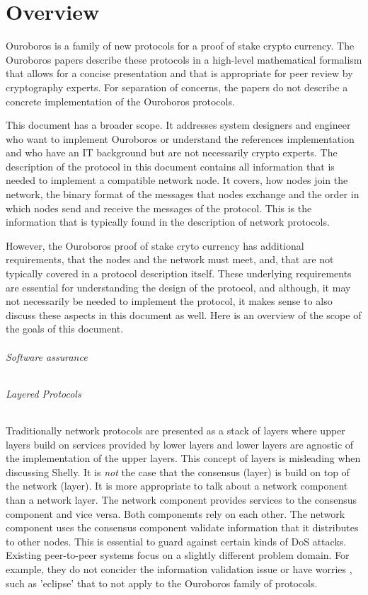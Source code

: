 \documentclass{report}
\newcommand{\wip}[1]{\color{magenta}{#1}\color{black}}
\theoremstyle{definition}{
  \newtheorem{lemma}{Lemma}[section] %
  \newtheorem{definition}[lemma]{Definition}
}
\theoremstyle{theorem}{
  \newtheorem{invariant}[lemma]{Invariant}
  \newtheorem{proofobligation}[lemma]{Proof Obligation}
}
\numberwithin{equation}{lemma}
\begin{document}
\chapter{Overview}
Ouroboros is a family of new protocols for a proof of stake crypto currency.
The Ouroboros papers describe these protocols in a high-level mathematical formalism
that allows for a concise presentation and that is appropriate for peer review by cryptography experts.
For separation of concerns, the papers do not describe a concrete implementation of the Ouroboros
protocols.

This document has a broader scope.
It addresses system designers and engineer who want to implement Ouroboros or understand
the references implementation and who have an IT background but are not necessarily crypto experts. 
The description of the protocol in this document contains
all information that is needed to implement a compatible network node.
It covers, how nodes join the network, the binary format of the messages that nodes exchange and
the order in which nodes send and receive the messages of the protocol.
This is the information that is typically found in the description of network protocols.

However, the Ouroboros proof of stake cryto currency has additional requirements,
that the nodes and the network must meet, and, that are not typically covered in a
protocol  description itself.
These underlying requirements are essential for understanding the design of the protocol, and
although, it may not necessarily be needed to implement the protocol,
it makes sense to also discuss these aspects in this document as well.
Here is an overview of the scope of the goals of this document.

\subparagraph{Software assurance}
\wip{Software assurance}

\subparagraph{Layered Protocols}
Traditionally network protocols are presented as a stack of layers where
upper layers build on services provided by lower layers and lower layers
are agnostic of the implementation of the upper layers.
This concept of layers is misleading when discussing Shelly.
It is {\em not} the case that the consensus (layer) is build on top of the network (layer).
It is more appropriate to talk about a network component than a network layer.
The network component provides services to the consensus component and vice versa.
Both componemts rely on each other.
The network component uses the consensus component validate
information that it distributes to other nodes.
This is essential to guard against certain kinds of DoS attacks.
Existing peer-to-peer systems focus on a slightly different problem domain.
For example, they do not concider the information validation issue
or have worries , such as 'eclipse' that to not
apply to the Ouroboros family of protocols.
\end{document}
